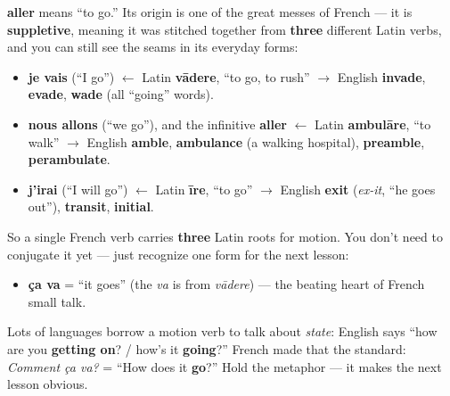 \begin{cousinweb}
\textbf{aller} means \textquotedblleft{}to go.\textquotedblright{} Its origin is one of the great messes of French — it is \textbf{suppletive}, meaning it was stitched together from \textbf{three} different Latin verbs, and you can still see the seams in its everyday forms:

\begin{itemize}
\raggedright
  \item \textbf{je vais} (\textquotedblleft{}I go\textquotedblright{}) $\leftarrow$ Latin \textbf{vādere}, \textquotedblleft{}to go, to rush\textquotedblright{} $\to$ English \textbf{invade}, \textbf{evade}, \textbf{wade} (all \textquotedblleft{}going\textquotedblright{} words).
  \item \textbf{nous allons} (\textquotedblleft{}we go\textquotedblright{}), and the infinitive \textbf{aller} $\leftarrow$ Latin \textbf{ambulāre}, \textquotedblleft{}to walk\textquotedblright{} $\to$ English \textbf{amble}, \textbf{ambulance} (a walking hospital), \textbf{preamble}, \textbf{perambulate}.
  \item \textbf{j'irai} (\textquotedblleft{}I will go\textquotedblright{}) $\leftarrow$ Latin \textbf{īre}, \textquotedblleft{}to go\textquotedblright{} $\to$ English \textbf{exit} (\emph{ex-it}, \textquotedblleft{}he goes out\textquotedblright{}), \textbf{transit}, \textbf{initial}.
\end{itemize}

So a single French verb carries \textbf{three} Latin roots for motion. You don't need to conjugate it yet — just recognize one form for the next lesson:

\begin{itemize}
\raggedright
  \item \textbf{ça va} = \textquotedblleft{}it goes\textquotedblright{} (the \emph{va} is from \emph{vādere}) — the beating heart of French small talk.
\end{itemize}
\end{cousinweb}

\begin{grammarlens}[title={Grammar Lens: \textquotedblleft{}going\textquotedblright{} as \textquotedblleft{}being\textquotedblright{}}]
Lots of languages borrow a motion verb to talk about \emph{state}: English says \textquotedblleft{}how are you \textbf{getting on}? / how's it \textbf{going}?\textquotedblright{} French made that the standard: \emph{Comment ça va?} = \textquotedblleft{}How does it \textbf{go}?\textquotedblright{} Hold the metaphor — it makes the next lesson obvious.
\end{grammarlens}

